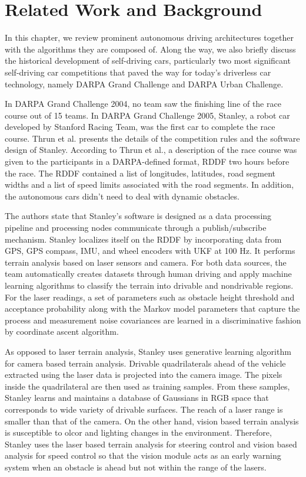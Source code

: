 \chapter{Related Work and Background}
\label{chp:b2}

In this chapter, we review prominent autonomous driving architectures together
with the algorithms they are composed of. Along the way, we also briefly
discuss the historical development of self-driving cars, particularly two most
significant self-driving car competitions that paved the way for today's
driverless car technology, namely DARPA Grand Challenge and DARPA Urban
Challenge.

In DARPA Grand Challenge 2004, no team saw the finishing line of the race
course out of 15 teams. In DARPA Grand Challenge 2005, Stanley, a robot car
developed by Stanford Racing Team, was the first car to complete the race
course.  Thrun et al. \cite{Thrun2006StanleyTR} presents the details of the
competition rules and the software design of Stanley. According to Thrun et
al., a description of the race course was given to the participants in a
DARPA-defined format, RDDF two hours before the race. The RDDF contained a list
of longitudes, latitudes, road segment widths and a list of speed limits
associated with the road segments. In addition, the autonomous cars didn't need
to deal with dynamic obstacles.

The authors state that Stanley's software is designed as a data processing
pipeline and processing nodes communicate through a publish/subscribe
mechanism. Stanley localizes itself on the RDDF by incorporating data from GPS,
GPS compass, IMU, and wheel encoders with UKF at 100 Hz. It performs terrain
analysis based on laser sensors and camera. For both data sources, the team
automatically creates datasets through human driving and apply machine learning
algorithms to classify the terrain into drivable and nondrivable regions. For
the laser readings, a set of parameters such as obstacle height threshold and
acceptance probability along with the Markov model parameters that capture the
process and measurement noise covariances are learned in a discriminative
fashion by coordinate ascent algorithm.

As opposed to laser terrain analysis, Stanley uses generative learning
algorithm for camera based terrain analysis. Drivable quadrilaterals ahead of
the vehicle extracted using the laser data is projected into the camera image.
The pixels inside the quadrilateral are then used as training samples. From
these samples, Stanley learns and maintains a database of Gaussians in RGB
space that corresponds to wide variety of drivable surfaces. The reach of a
laser range is smaller than that of the camera. On the other hand, vision based
terrain analysis is susceptible to olcor and lighting changes in the
environment.  Therefore, Stanley uses the laser based terrain analysis for
steering control and vision based analysis for speed control so that the vision
module acts as an early warning system when an obstacle is ahead but not within
the range of the lasers.

